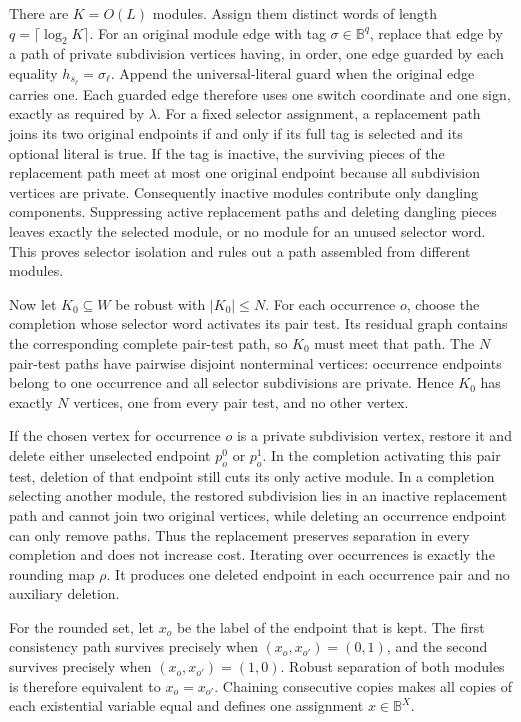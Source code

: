 There are \(K=O(L)\) modules.  Assign them distinct words of length \(q=\lceil\log_2 K\rceil\).  For an original module edge with tag \(\sigma\in\mathbb B^q\), replace that edge by a path of private subdivision vertices having, in order, one edge guarded by each equality \(h_{s_\ell}=\sigma_\ell\).  Append the universal-literal guard when the original edge carries one.  Each guarded edge therefore uses one switch coordinate and one sign, exactly as required by \(\lambda\).  For a fixed selector assignment, a replacement path joins its two original endpoints if and only if its full tag is selected and its optional literal is true.  If the tag is inactive, the surviving pieces of the replacement path meet at most one original endpoint because all subdivision vertices are private.  Consequently inactive modules contribute only dangling components.  Suppressing active replacement paths and deleting dangling pieces leaves exactly the selected module, or no module for an unused selector word.  This proves selector isolation and rules out a path assembled from different modules.

Now let \(K_0\subseteq W\) be robust with \(|K_0|\le N\).  For each occurrence \(o\), choose the completion whose selector word activates its pair test.  Its residual graph contains the corresponding complete pair-test path, so \(K_0\) must meet that path.  The \(N\) pair-test paths have pairwise disjoint nonterminal vertices: occurrence endpoints belong to one occurrence and all selector subdivisions are private.  Hence \(K_0\) has exactly \(N\) vertices, one from every pair test, and no other vertex.

If the chosen vertex for occurrence \(o\) is a private subdivision vertex, restore it and delete either unselected endpoint \(p_o^0\) or \(p_o^1\).  In the completion activating this pair test, deletion of that endpoint still cuts its only active module.  In a completion selecting another module, the restored subdivision lies in an inactive replacement path and cannot join two original vertices, while deleting an occurrence endpoint can only remove paths.  Thus the replacement preserves separation in every completion and does not increase cost.  Iterating over occurrences is exactly the rounding map \(\rho\).  It produces one deleted endpoint in each occurrence pair and no auxiliary deletion.

For the rounded set, let \(x_o\) be the label of the endpoint that is kept.  The first consistency path survives precisely when \((x_o,x_{o'})=(0,1)\), and the second survives precisely when \((x_o,x_{o'})=(1,0)\).  Robust separation of both modules is therefore equivalent to \(x_o=x_{o'}\).  Chaining consecutive copies makes all copies of each existential variable equal and defines one assignment \(x\in\mathbb B^X\).

